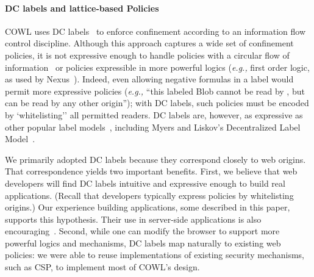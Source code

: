 
%



\paragraph{DC labels and lattice-based Policies}
\label{sec:discussion:lattice}

COWL uses DC labels~\cite{stefan:2011:dclabels} to enforce
confinement according to an information flow control discipline.
%
Although this approach captures a wide set of confinement policies, it
is not expressive enough to handle policies with a circular flow of
information~\cite{Badger:1995} or policies expressible in more
powerful logics (\emph{e.g.,} first order logic, as used by
Nexus~\cite{sirer2011logical}).
%
Indeed, even allowing negative formulas in a label would permit more
expressive policies (\emph{e.g.,} ``this labeled Blob cannot be read
by , but can be read by any other origin''); with DC
labels, such policies must be encoded by `whitelisting'' all permitted
readers.
%
DC labels are, however, as expressive as other popular label
models~\cite{GenLabels}, including Myers and Liskov's Decentralized
Label Model~\cite{dlm}.

We primarily adopted DC labels because they correspond closely to
web origins.
%
That correspondence yields two important benefits.
%
First, we believe that web developers will find DC labels intuitive
and expressive enough to build real applications.
%
(Recall that developers typically express policies by whitelisting
origins.)
%
Our experience building applications, some described in this paper,
supports this hypothesis. Their use in server-side applications is
also encouraging~\cite{giffin:2012:hails, Breeze13, stoughton2014you,
  stefan:2011:flexible}.
%
Second, while one can modify the browser to support more powerful
logics and mechanisms, DC labels map naturally to existing web
policies: we were able to reuse implementations of existing security
mechanisms, such as CSP, to implement most of COWL's design.



